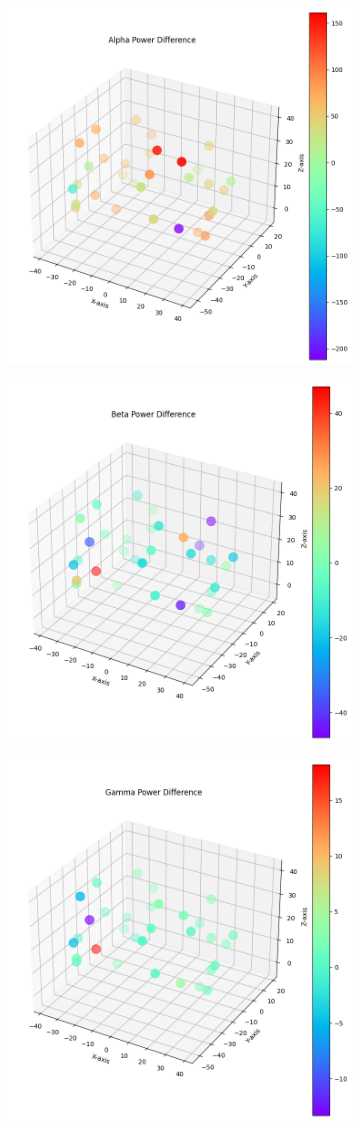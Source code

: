 \documentclass[format=sigconf, nonacm=true, review=true, screen=true]{acmart}
\begin{document}
\begin{figure}[H]
     \centering
     \begin{subfigure}
         \centering
         \includegraphics[width=0.48\columnwidth]{figures/cluster-alpha.png}
     \end{subfigure}
     \begin{subfigure}
         \centering
         \includegraphics[width=0.48\columnwidth]{figures/cluster-beta.png}
     \end{subfigure}
     \begin{subfigure}
         \centering
         \includegraphics[width=0.48\columnwidth]{figures/cluster-gamma.png}

\end{subfigure}
\end{figure}
\end{document}
